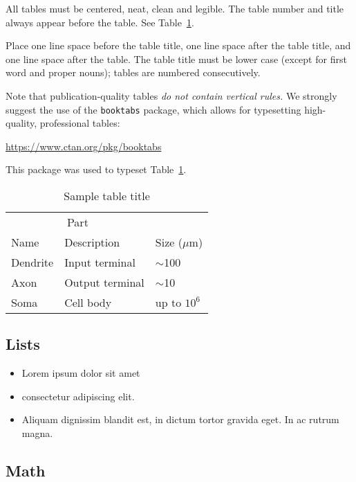 \documentclass{article}
\begin{document}
All tables must be centered, neat, clean and legible.  The table number and
title always appear before the table.  See Table~\ref{tab:table}.

Place one line space before the table title, one line space after the
table title, and one line space after the table. The table title must
be lower case (except for first word and proper nouns); tables are
numbered consecutively.

Note that publication-quality tables \emph{do not contain vertical rules.} We
strongly suggest the use of the \verb+booktabs+ package, which allows for
typesetting high-quality, professional tables:
\begin{center}
  \url{https://www.ctan.org/pkg/booktabs}
\end{center}
This package was used to typeset Table~\ref{tab:table}.

\begin{table}
  \caption{Sample table title}
  \label{tab:table}
  \centering
  \begin{tabular}{lll}
    \toprule
    \multicolumn{2}{c}{Part}                   \\
    \cmidrule(r){1-2}
    Name     & Description     & Size ($\mu$m) \\
    \midrule
    Dendrite & Input terminal  & $\sim$100     \\
    Axon     & Output terminal & $\sim$10      \\
    Soma     & Cell body       & up to $10^6$  \\
    \bottomrule
  \end{tabular}
\end{table}

\subsection{Lists}

\begin{itemize}
  \item Lorem ipsum dolor sit amet
  \item consectetur adipiscing elit.
  \item Aliquam dignissim blandit est, in dictum tortor gravida eget. In ac rutrum magna.
\end{itemize}

\subsection{Math}
\end{document}
